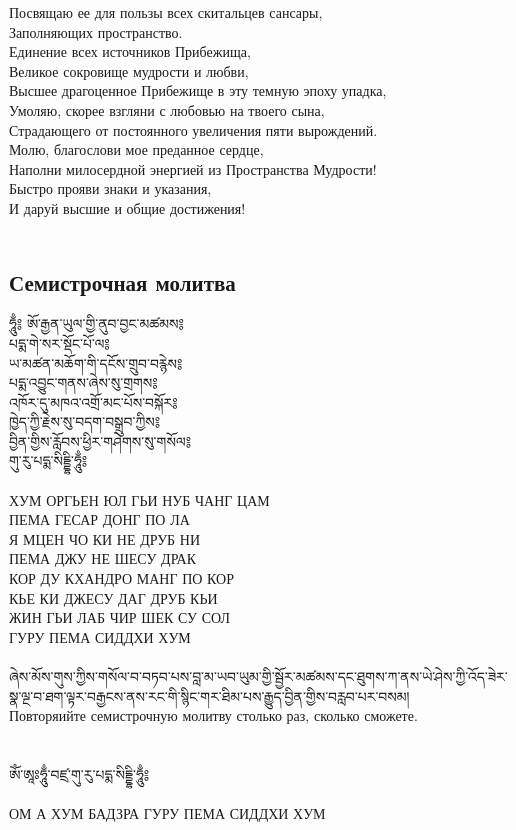 Посвящаю ее для пользы всех скитальцев сансары, \\
Заполняющих пространство. \\
Единение всех источников Прибежища, \\
Великое сокровище мудрости и любви, \\
Высшее драгоценное Прибежище в эту темную эпоху упадка, \\
Умоляю, скорее взгляни с любовью на твоего сына, \\
Страдающего от постоянного увеличения пяти вырождений. \\
Молю, благослови мое преданное сердце, \\
Наполни милосердной энергией из Пространства Мудрости! \\
Быстро прояви знаки и указания, \\
И даруй высшие и общие достижения! \\
\\
\newpage
\subsection{Семистрочная молитва}

\ti ཧཱུྃ༔ ཨོ་རྒྱན་ཡུལ་གྱི་ནུབ་བྱང་མཚམས༔\\
པདྨ་གེ་སར་སྡོང་པོ་ལ༔\\
ཡ་མཚན་མཆོག་གི་དངོས་གྲུབ་བརྙེས༔\\
པདྨ་འབྱུང་གནས་ཞེས་སུ་གྲགས༔\\
འཁོར་དུ་མཁའ་འགྲོ་མང་པོས་བསྐོར༔\\
ཁྱེད་ཀྱི་རྗེས་སུ་བདག་བསྒྲུབ་ཀྱིས༔\\
བྱིན་གྱིས་རློབས་ཕྱིར་གཤེགས་སུ་གསོལ༔\\
གུ་རུ་པདྨ་སིདྡྷི་ཧཱུྃ༔\\
\\
\ru
ХУМ ОРГЬЕН ЮЛ ГЬИ НУБ ЧАНГ ЦАМ \\
ПЕМА ГЕСАР ДОНГ ПО ЛА \\
Я МЦЕН ЧО КИ НЕ ДРУБ НИ \\
ПЕМА ДЖУ НЕ ШЕСУ ДРАК \\
КОР ДУ КХАНДРО МАНГ ПО КОР \\
КЬЕ КИ ДЖЕСУ ДАГ ДРУБ КЬИ \\
ЖИН ГЬИ ЛАБ ЧИР ШЕК СУ СОЛ\\
ГУРУ ПЕМА СИДДХИ ХУМ\\
\\
\scriptsize
\ti
ཞེས་མོས་གུས་ཀྱིས་གསོལ་བ་བཏབ་པས་བླ་མ་ཡབ་ཡུམ་གྱི་སྦྱོར་མཚམས་དང་ཐུགས་ཀ་ནས་ཡེ་ཤེས་ཀྱི་འོད་ཟེར་སྣ་ལྔ་བ་ཐག་ལྟར་བརྒྱངས་ནས་རང་གི་སྙིང་གར་ཐིམ་པས་རྒྱུད་བྱིན་གྱིས་བརླབ་པར་བསམ།\\
\ru
Повторяийте семистрочную молитву столько раз, сколько сможете.\\
\normalsize
\\
\\
\ti
ཨོཾ་ཨཱཿཧཱུྃ་བཛྲ་གུ་རུ་པདྨ་སིདྡྷི་ཧཱུྃ༔\\
\\
\ru
ОМ А ХУМ БАДЗРА ГУРУ ПЕМА СИДДХИ ХУМ\\
\\
\newpage
